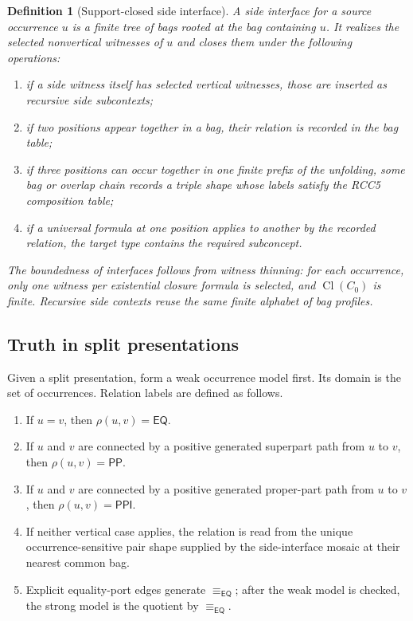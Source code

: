 \documentclass[11pt]{article}
\newtheorem{definition}[theorem]{Definition}
\newcommand{\EQ}{\mathsf{EQ}}
\newcommand{\PP}{\mathsf{PP}}
\newcommand{\PPI}{\mathsf{PPI}}
\newcommand{\Cl}{\operatorname{Cl}}
\begin{document}
\begin{definition}[Support-closed side interface]
A side interface for a source occurrence $u$ is a finite tree of bags rooted at the bag containing $u$.  It realizes the selected nonvertical witnesses of $u$ and closes them under the following operations:
\begin{enumerate}[label=(M\arabic*)]
\item if a side witness itself has selected vertical witnesses, those are inserted as recursive side subcontexts;
\item if two positions appear together in a bag, their relation is recorded in the bag table;
\item if three positions can occur together in one finite prefix of the unfolding, some bag or overlap chain records a triple shape whose labels satisfy the RCC5 composition table;
\item if a universal formula at one position applies to another by the recorded relation, the target type contains the required subconcept.
\end{enumerate}
The boundedness of interfaces follows from witness thinning: for each occurrence, only one witness per existential closure formula is selected, and $\Cl(C_0)$ is finite.  Recursive side contexts reuse the same finite alphabet of bag profiles.
\end{definition}

\subsection{Truth in split presentations}

Given a split presentation, form a weak occurrence model first.  Its domain is the set of occurrences.  Relation labels are defined as follows.

\begin{enumerate}[label=(L\arabic*)]
\item If $u=v$, then $\rho(u,v)=\EQ$.
\item If $u$ and $v$ are connected by a positive generated superpart path from $u$ to $v$, then $\rho(u,v)=\PP$.
\item If $u$ and $v$ are connected by a positive generated proper-part path from $u$ to $v$, then $\rho(u,v)=\PPI$.
\item If neither vertical case applies, the relation is read from the unique occurrence-sensitive pair shape supplied by the side-interface mosaic at their nearest common bag.
\item Explicit equality-port edges generate $\equiv_{\EQ}$; after the weak model is checked, the strong model is the quotient by $\equiv_{\EQ}$.
\end{enumerate}
\end{document}
